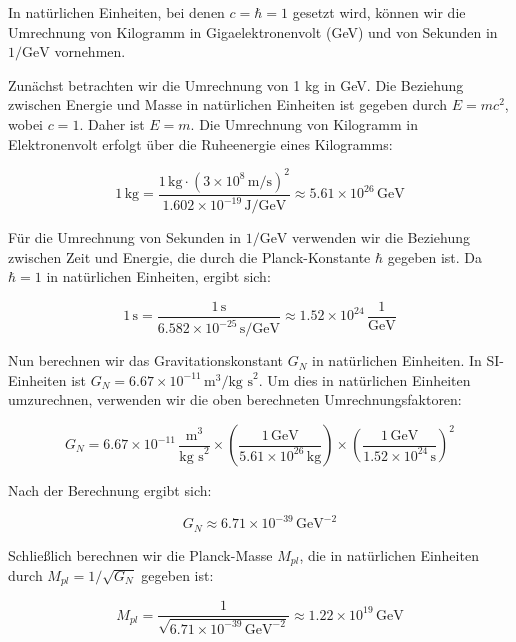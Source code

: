 In natürlichen Einheiten, bei denen $c = \hbar = 1$ gesetzt wird, können wir die Umrechnung von Kilogramm in Gigaelektronenvolt (GeV) und von Sekunden in $1/\mathrm{GeV}$ vornehmen. 

Zunächst betrachten wir die Umrechnung von 1 kg in GeV. Die Beziehung zwischen Energie und Masse in natürlichen Einheiten ist gegeben durch $E = mc^2$, wobei $c = 1$. Daher ist $E = m$. Die Umrechnung von Kilogramm in Elektronenvolt erfolgt über die Ruheenergie eines Kilogramms:

\[
1 \, \text{kg} = \frac{1 \, \text{kg} \cdot (3 \times 10^8 \, \text{m/s})^2}{1.602 \times 10^{-19} \, \text{J/GeV}} \approx 5.61 \times 10^{26} \, \text{GeV}
\]

Für die Umrechnung von Sekunden in $1/\mathrm{GeV}$ verwenden wir die Beziehung zwischen Zeit und Energie, die durch die Planck-Konstante $\hbar$ gegeben ist. Da $\hbar = 1$ in natürlichen Einheiten, ergibt sich:

\[
1 \, \text{s} = \frac{1 \, \text{s}}{6.582 \times 10^{-25} \, \text{s/GeV}} \approx 1.52 \times 10^{24} \, \frac{1}{\mathrm{GeV}}
\]

Nun berechnen wir das Gravitationskonstant $G_N$ in natürlichen Einheiten. In SI-Einheiten ist $G_N = 6.67 \times 10^{-11} \, \text{m}^3/\text{kg s}^2$. Um dies in natürlichen Einheiten umzurechnen, verwenden wir die oben berechneten Umrechnungsfaktoren:

\[
G_N = 6.67 \times 10^{-11} \, \frac{\text{m}^3}{\text{kg s}^2} \times \left( \frac{1 \, \text{GeV}}{5.61 \times 10^{26} \, \text{kg}} \right) \times \left( \frac{1 \, \text{GeV}}{1.52 \times 10^{24} \, \text{s}} \right)^2
\]

Nach der Berechnung ergibt sich:

\[
G_N \approx 6.71 \times 10^{-39} \, \text{GeV}^{-2}
\]

Schließlich berechnen wir die Planck-Masse $M_{pl}$, die in natürlichen Einheiten durch $M_{pl} = 1/\sqrt{G_N}$ gegeben ist:

\[
M_{pl} = \frac{1}{\sqrt{6.71 \times 10^{-39} \, \text{GeV}^{-2}}} \approx 1.22 \times 10^{19} \, \text{GeV}
\]